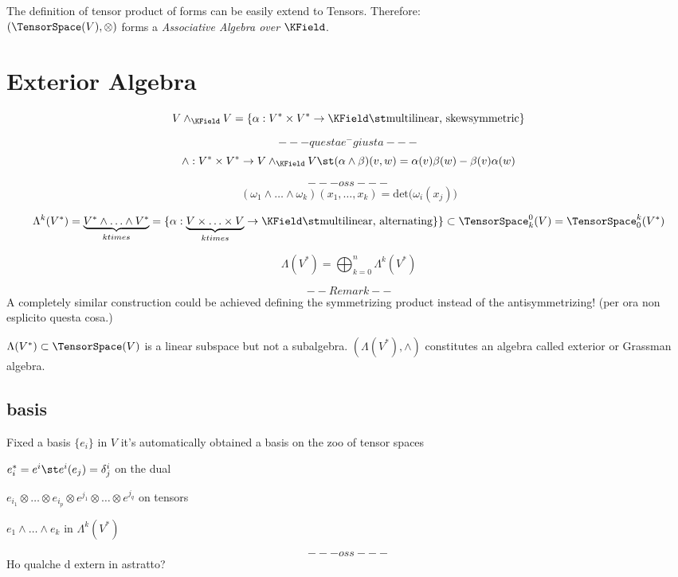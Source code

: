 \documentclass[a4paper,10pt]{scrartcl}
\begin{document}
The definition of tensor product of forms can be easily extend to Tensors. Therefore:\\
$\left( \TensorSpace(V), \otimes \right)$ forms a \emph{Associative Algebra over $\KField$}.


\section{Exterior Algebra}
\begin{displaymath}
 V \wedge_\KField V = \left\{ \alpha: V^\ast \times V^\ast \rightarrow \KField \st \textrm{multilinear, skewsymmetric} \right\}
\end{displaymath}

$$--- questa e^- giusta ---$$
\begin{displaymath}
 \wedge : V^\ast \times V^\ast \rightarrow V \wedge_\KField V  \st (\alpha \wedge \beta ) ( v,w) = \alpha(v) \beta(w) -\beta(v)\alpha(w)
\end{displaymath}



$$--- oss ---$$
\begin{displaymath}
 \left( \omega_1 \wedge \ldots \wedge \omega_k \right) (x_1, \ldots, x_k) = \textrm{det}\big(\omega_i(x_j) \big)
\end{displaymath}



\begin{displaymath}
 \Lambda^k(V^*) = \underbrace{V^\ast \wedge \ldots \wedge V^\ast}_{k times} = \{ \alpha : \underbrace{V \times \ldots \times V}_{k times} \rightarrow \KField \st \textrm{multilinear, alternating}\}
 \} \subset \TensorSpace^0_k(V) = \TensorSpace^k_0(V^\ast)
\end{displaymath}

\begin{displaymath}
 \Lambda(V^*) = \bigoplus_{k=0}^{n} \Lambda^k(V^\ast)
\end{displaymath}


$$-- Remark --$$
A completely similar construction could be achieved defining the symmetrizing product instead of the antisymmetrizing! (per ora non esplicito questa cosa.)

$\Lambda(V^*)\subset \TensorSpace(V) $ is a linear subspace but not a subalgebra. $(\Lambda(V^\ast), \wedge)$ constitutes an algebra called exterior or Grassman algebra.


\subsection{basis}
Fixed a basis $\{e_i\}$ in $V$ it's automatically obtained a basis on the zoo of tensor spaces

$e^\ast_i = e^i \st e^i(e_j) = \delta^i_j $ on the dual

$e_{i_1} \otimes \ldots \otimes e_{i_p} \otimes e^{j_1} \otimes \ldots \otimes e^{j_q}$ on tensors

$e_1 \wedge \ldots \wedge e_k $ in $\Lambda^k(V^*)$


$$--- oss ---$$
Ho qualche d extern in astratto?

	
	
\end{document}
